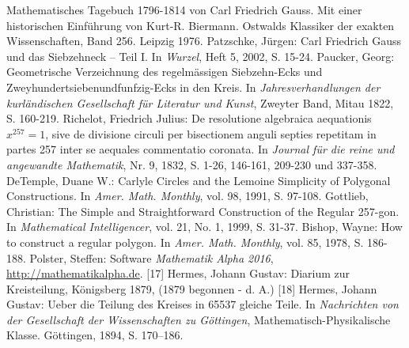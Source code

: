 
\begin{thebibliography}{xxx}
 Mathematisches Tagebuch 1796-1814 von Carl Friedrich
  Gauss. Mit einer historischen Einführung von Kurt-R. Biermann. Ostwalds
  Klassiker der exakten Wissenschaften, Band 256. Leipzig 1976.
 Patzschke, Jürgen: Carl Friedrich Gauss und das
  Siebzehneck -- Teil I. In \emph{Wurzel}, Heft 5, 2002, S. 15-24.
 Paucker, Georg: Geometrische Verzeichnung des
  regelmässigen Siebzehn-Ecks und Zweyhundertsiebenundfunfzig-Ecks in den
  Kreis. In \emph{Jahresverhandlungen der kurländischen Gesellschaft für
    Literatur und Kunst}, Zweyter Band, Mitau 1822, S. 160-219.
 Richelot, Friedrich Julius: De resolutione algebraica
  aequationis $x^{257} = 1$, sive de divisione circuli per bisectionem anguli
  septies repetitam in partes 257 inter se aequales commentatio coronata. In
  \emph{Journal für die reine und angewandte Mathematik}, Nr. 9, 1832,
  S. 1-26, 146-161, 209-230 und 337-358.
 DeTemple, Duane W.: Carlyle Circles and the Lemoine
  Simplicity of Polygonal Constructions. In \emph{Amer. Math.  Monthly},
  vol. 98, 1991, S. 97-108.
 Gottlieb, Christian: The Simple and Straightforward
  Construction of the Regular 257-gon. In \emph{Mathematical Intelligencer},
  vol. 21, No. 1, 1999, S. 31-37.
 Bishop, Wayne: How to construct a regular polygon. In
  \emph{Amer. Math. Monthly}, vol. 85, 1978, S. 186-188.
 Polster, Steffen: Software \emph{Mathematik Alpha 2016},
  \url{http://mathematikalpha.de}.
 [17] Hermes, Johann Gustav: Diarium zur Kreisteilung,
  Königsberg 1879, (1879 begonnen - d. A.)
 [18] Hermes, Johann Gustav: Ueber die Teilung des Kreises
  in 65537 gleiche Teile. In \emph{Nachrichten von der Gesellschaft der
  Wissenschaften zu Göttingen}, Mathematisch-Physikalische Klasse. Göttingen,
  1894, S. 170–186.
\end{thebibliography}

